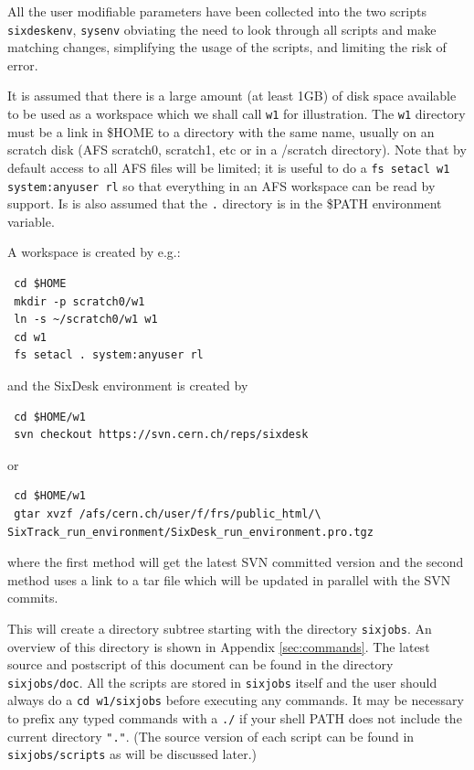 \documentclass{article}    %
\begin{document}
All the user modifiable parameters have been collected into the two scripts
{\tt sixdeskenv}, {\tt sysenv} obviating the need to look through all scripts
and make matching changes, simplifying the usage of the scripts, and limiting
the risk of error.

It is assumed that there is a large amount (at least 1GB) of disk space
available to be used as a workspace which we shall call {\tt w1} for
illustration. The {\tt w1} directory must be a link in \$HOME to a directory
with the same name, usually on an scratch disk (AFS scratch0, scratch1, etc or
in a /scratch directory).  Note that by default access to all AFS files will
be limited; it is useful to do a {\tt fs setacl w1 system:anyuser rl} so that
everything in an AFS workspace can be read by support. Is is also assumed that the {\tt .} directory is in the {\$PATH} environment variable.

A workspace is created by e.g.:
\begin{verbatim}
 cd $HOME
 mkdir -p scratch0/w1
 ln -s ~/scratch0/w1 w1 
 cd w1
 fs setacl . system:anyuser rl
\end{verbatim}
and the SixDesk environment is created by 
\begin{verbatim}
 cd $HOME/w1
 svn checkout https://svn.cern.ch/reps/sixdesk
\end{verbatim}
or
\begin{verbatim}
 cd $HOME/w1
 gtar xvzf /afs/cern.ch/user/f/frs/public_html/\
SixTrack_run_environment/SixDesk_run_environment.pro.tgz
\end{verbatim}
where the first method will get the latest SVN committed version
and the second method uses a link to a tar file which will be updated 
in parallel with the SVN commits.  

This will create a directory subtree starting with
the directory {\tt sixjobs}. An overview of this directory is
shown in Appendix \ref{sec:commands}. 
The latest source and postscript of this document can be found 
in the directory {\tt sixjobs/doc}.
All the scripts are stored in {\tt sixjobs} itself
and the user should always do a
{\tt cd w1/sixjobs} before executing any commands. It may be
necessary to prefix any typed commands with a {\tt ./} if your 
shell PATH does not include the current directory {\tt "."}. 
(The source version of each script can be found
in {\tt sixjobs/scripts} as will be discussed later.)
\end{document}
